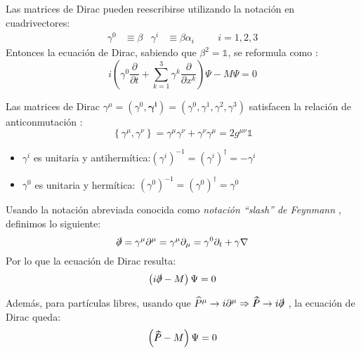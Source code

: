 Las matrices de Dirac pueden reescribirse utilizando la notación en cuadrivectores:
\begin{align}
\gamma ^0 &\equiv \beta & \gamma ^i &\equiv \beta \alpha_i \hspace{1cm} i=1, 2, 3 \label{eq:matricesDirac}
\end{align}
Entonces la ecuación de Dirac, sabiendo que $\beta^2=\mathbb{1}$, se reformula como \cite{MCR}:
\begin{equation}
i\left( \gamma ^{0}\dfrac{\partial }{\partial t}+\sum ^{3}_{k=1}\gamma ^{k}\dfrac{\partial }{\partial x^{k}}\right) \Psi -M\Psi =0\label{eq:ecDirac_cov}
\end{equation}

Las matrices de Dirac $\gamma^{\mu}=(\gamma^0, \boldsymbol{\gamma^{i}})=(\gamma^0, \gamma^1, \gamma^2, \gamma^3)$ satisfacen la relación de anticonmutación \cite{MCR}:
\begin{equation}
\left\{ \gamma ^{\mu },\gamma ^{\nu }\right\} =\gamma ^{\mu }\gamma ^{\nu }+\gamma ^{\nu }\gamma ^{\mu }=2g^{\mu \nu }\mathbb{1}\label{eq:anticomm_relation}
\end{equation}
\begin{itemize}
\item $\gamma^{i}$ es unitaria y antihermítica:$\left( \gamma ^{i}\right) ^{-1}=\left( \gamma ^{i}\right) ^{\dagger}=-\gamma ^{i}$
\item $\gamma^{0}$ es unitaria y hermítica: $\left( \gamma ^{0}\right) ^{-1}=\left( \gamma ^{0}\right) ^{\dagger}=\gamma ^{0}$
\end{itemize}

Usando la notación abreviada conocida como \textit{notación ``slash'' de Feynmann} \cite{MCR}, definimos lo siguiente:
\begin{equation*}
\slashed{\partial}=\gamma ^{\mu }\partial ^{\mu }=\gamma ^{\mu }\partial _{\mu }=\gamma ^{0}\partial _{t}+\gamma \nabla
\end{equation*}
Por lo que la ecuación de Dirac resulta:
\begin{equation}
\left(i \slashed{\partial}-M\right) \Psi =0\label{eq:Dirac_final}
\end{equation}

Además, para partículas libres, usando que $\widehat{P}^{\mu} \rightarrow i\partial^{\mu} \Rightarrow \slashed{\widehat{P}} \rightarrow i\slashed{\partial}$ \cite{MCR}, la ecuación de Dirac queda:
\begin{equation}
\left( \slashed{\widehat{P}}-M\right) \Psi =0\label{eq:Dirac_free}
\end{equation}

